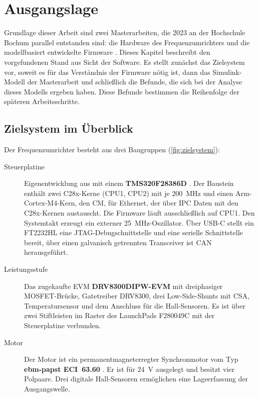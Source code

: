 \chapter{Ausgangslage}
\label{ch:ausgangslage}

Grundlage dieser Arbeit sind zwei Masterarbeiten, die 2023 an der Hochschule Bochum
parallel entstanden sind: die Hardware des Frequenzumrichters \cite{darici2023} und die
modellbasiert entwickelte Firmware \cite{akguel2023}. Dieses Kapitel beschreibt den
vorgefundenen Stand aus Sicht der Software. Es stellt zunächst das Zielsystem vor, soweit
es für das Verständnis der Firmware nötig ist, dann das Simulink-Modell der Masterarbeit
und schließlich die Befunde, die sich bei der Analyse dieses Modells ergeben haben. Diese
Befunde bestimmen die Reihenfolge der späteren Arbeitsschritte.

\section{Zielsystem im Überblick}
\label{sec:zielsystem}

Der Frequenzumrichter besteht aus drei Baugruppen (\cref{fig:zielsystem}):

\begingroup\sloppy
\begin{description}
  \item[Steuerplatine] Eigenentwicklung aus \cite{darici2023} mit einem
    \textbf{TMS320F28386D} \cite{ti_f2838x_dm}. Der Baustein
    enthält zwei C28x-Kerne (CPU1, CPU2) mit je \SI{200}{\mega\hertz} und einen
    Arm-Cortex-M4-Kern, den \ac{CM}, für Ethernet, der über \ac{IPC} Daten mit den C28x-Kernen
    austauscht. Die Firmware läuft ausschließlich auf CPU1.
    Den Systemtakt erzeugt ein externer \SI{25}{\mega\hertz}-Oszillator. Über USB-C stellt
    ein FT2232HL eine \acs{JTAG}-Debugschnittstelle und eine serielle
    Schnittstelle bereit, über einen galvanisch getrennten Transceiver ist \ac{CAN}
    herausgeführt.
  \item[Leistungsstufe] Das zugekaufte \ac{EVM} \textbf{DRV8300DIPW-EVM}
    \cite{ti_slvubv6} mit dreiphasiger MOSFET-Brücke, Gatetreiber DRV8300, drei
    Low-Side-Shunts mit \ac{CSA}, Temperatursensor und dem Anschluss für die
    Hall-Sensoren. Es ist über zwei Stiftleisten im Raster des LaunchPads F280049C mit
    der Steuerplatine verbunden.
  \item[Motor] Der Motor ist ein permanentmagneterregter Synchronmotor vom Typ \textbf{ebm-papst ECI~63.60} \cite{ebmpapst_eci6360}. Er ist
     für \SI{24}{\volt} ausgelegt und besitzt vier Polpaare. Drei digitale Hall-Sensoren ermöglichen eine Lageerfassung der Ausgangswelle.
\end{description}
\endgroup


